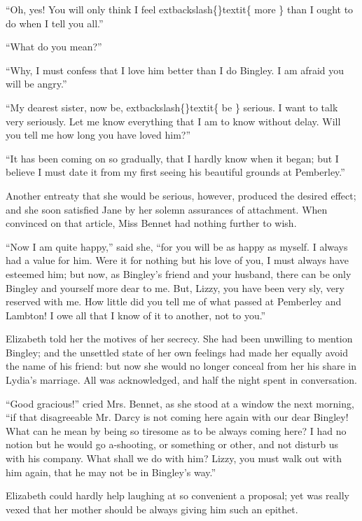 \documentclass[10pt]{book}
\begin{document}
   “Oh, yes! You will only think I feel
   	extbackslash\{\}textit\{
    more
   \}
   than I ought to do when I
tell you all.”
  

   “What do you mean?”
  

   “Why, I must confess that I love him better than I do Bingley. I am
afraid you will be angry.”
  

   “My dearest sister, now be,
   	extbackslash\{\}textit\{
    be
   \}
   serious. I want to talk very seriously.
Let me know everything that I am to know without delay. Will you tell me
how long you have loved him?”
  

   “It has been coming on so gradually, that I hardly know when it began;
but I believe I must date it from my first seeing his beautiful grounds
at Pemberley.”
  

   Another entreaty that she would be serious, however, produced the
desired effect; and she soon satisfied Jane by her solemn assurances of
attachment. When convinced on that article, Miss Bennet had nothing
further to wish.
  

   “Now I am quite happy,” said she, “for you will be as happy as myself. I
always had a value for him. Were it for nothing but his love of you, I
must always have esteemed him; but now, as Bingley’s friend and your
husband, there can be only Bingley and yourself more dear to me. But,
Lizzy, you have been very sly, very reserved with me. How little did you
tell me of what passed at Pemberley and Lambton! I owe all that I know
of it to another, not to you.”
  

   Elizabeth told her the motives of her secrecy. She had been unwilling to
mention Bingley; and the unsettled state of her own feelings had made
her equally avoid the name of his friend: but now she would no longer
conceal from her his share in Lydia’s marriage. All was acknowledged,
and half the night spent in conversation.
  

   “Good gracious!” cried Mrs. Bennet, as she stood at a window the next
morning, “if that disagreeable Mr. Darcy is not coming here again with
our dear Bingley! What can he mean by being so tiresome as to be always
coming here? I had no notion but he would go a-shooting, or something or
other, and not disturb us with his company. What shall we do with him?
Lizzy, you must walk out with him again, that he may not be in Bingley’s
way.”
  

   Elizabeth could hardly help laughing at so convenient a proposal; yet
was really vexed that her mother should be always giving him such an
epithet.
  
\end{document}
